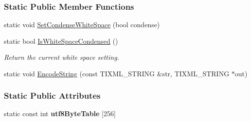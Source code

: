 \subsubsection*{Static Public Member Functions}
\begin{DoxyCompactItemize}
\item 
static void \hyperlink{class_ti_xml_base_a0f799ec645bfb8d8a969e83478f379c1}{SetCondenseWhiteSpace} (bool condense)
\item 
\hypertarget{class_ti_xml_base_ad4b1472531c647a25b1840a87ae42438}{
static bool \hyperlink{class_ti_xml_base_ad4b1472531c647a25b1840a87ae42438}{IsWhiteSpaceCondensed} ()}
\label{class_ti_xml_base_ad4b1472531c647a25b1840a87ae42438}

\begin{DoxyCompactList}\small\item\em Return the current white space setting. \item\end{DoxyCompactList}\item 
static void \hyperlink{class_ti_xml_base_a32ed202562b58de64c7d799ca3c9db98}{EncodeString} (const TIXML\_\-STRING \&str, TIXML\_\-STRING $\ast$out)
\end{DoxyCompactItemize}
\subsubsection*{Static Public Attributes}
\begin{DoxyCompactItemize}
\item 
static const int {\bfseries utf8ByteTable} \mbox{[}256\mbox{]}
\end{DoxyCompactItemize}
